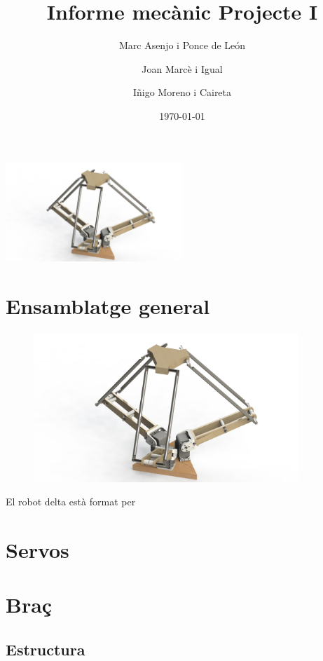 \documentclass[a4paper, 10pt]{article}
\begin{document}
\title{Informe mecànic Projecte I}
\author{Marc Asenjo i Ponce de León \and
		Joan Marcè i Igual \and
		Iñigo Moreno i Caireta}
\date{\today}
\maketitle
\begin{center}
\includegraphics[width=0.5\textwidth]{./images/logo}
\end{center}

\newpage
\tableofcontents{}

\newpage
\section{Ensamblatge general}


\begin{figure}[h!]
\centering
\includegraphics[width=10cm]{./images/general}
\end{figure}

El robot delta està format per


\newpage
\section{Servos}


\newpage
\section{Braç}

\subsection{Estructura}
\end{document}
